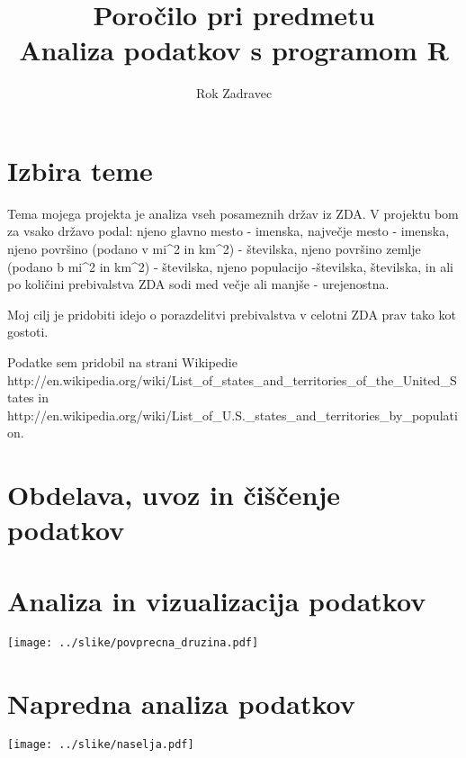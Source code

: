 \documentclass[11pt,a4paper]{article}
\begin{document}
\title{Poročilo pri predmetu \\
Analiza podatkov s programom R}
\author{Rok Zadravec}
\maketitle

\section{Izbira teme}

Tema mojega projekta je analiza vseh posameznih držav iz ZDA. V projektu bom za vsako državo podal: 
njeno glavno mesto - imenska, največje mesto - imenska, njeno površino (podano v mi^2 in km^2) - številska, 
njeno površino zemlje (podano b mi^2 in km^2) - številska, njeno populacijo -številska, številska, 
in ali po količini prebivalstva ZDA sodi med večje ali manjše - urejenostna.

Moj cilj je pridobiti idejo o porazdelitvi prebivalstva v celotni ZDA prav tako kot gostoti.

Podatke sem pridobil na strani Wikipedie http://en.wikipedia.org/wiki/List_of_states_and_territories_of_the_United_States in 
http://en.wikipedia.org/wiki/List_of_U.S._states_and_territories_by_population.


\section{Obdelava, uvoz in čiščenje podatkov}

\section{Analiza in vizualizacija podatkov}

\texttt{[image: ../slike/povprecna\_druzina.pdf]}

\section{Napredna analiza podatkov}

\texttt{[image: ../slike/naselja.pdf]}
\end{document}
